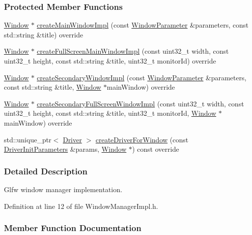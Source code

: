 \subsubsection*{Protected Member Functions}
\begin{DoxyCompactItemize}
\item 
\hyperlink{a00082}{Window} $\ast$ \hyperlink{a00090_ab33ae118afb5a7048c61d437e54b5c43}{create\+Main\+Window\+Impl} (const \hyperlink{a00091}{Window\+Parameter} \&parameters, const std\+::string \&title) override
\item 
\hyperlink{a00082}{Window} $\ast$ \hyperlink{a00090_acb8925ac309ba2705221a8db7357bb60}{create\+Full\+Screen\+Main\+Window\+Impl} (const uint32\+\_\+t width, const uint32\+\_\+t height, const std\+::string \&title, uint32\+\_\+t monitor\+Id) override
\item 
\hyperlink{a00082}{Window} $\ast$ \hyperlink{a00090_aed46f77f80b40c2a2e6ec23cb5dc5bf7}{create\+Secondary\+Window\+Impl} (const \hyperlink{a00091}{Window\+Parameter} \&parameters, const std\+::string \&title, \hyperlink{a00082}{Window} $\ast$main\+Window) override
\item 
\hyperlink{a00082}{Window} $\ast$ \hyperlink{a00090_a7fce1ce88b1aa3ec24b0b78fd5e56a64}{create\+Secondary\+Full\+Screen\+Window\+Impl} (const uint32\+\_\+t width, const uint32\+\_\+t height, const std\+::string \&title, uint32\+\_\+t monitor\+Id, \hyperlink{a00082}{Window} $\ast$main\+Window) override
\item 
std\+::unique\+\_\+ptr$<$ \hyperlink{a00024}{Driver} $>$ \hyperlink{a00090_a8d7410a6f39bc3f2e4255939e2549e9b}{create\+Driver\+For\+Window} (const \hyperlink{a00028}{Driver\+Init\+Parameters} \&params, \hyperlink{a00082}{Window} $\ast$) const  override
\end{DoxyCompactItemize}


\subsubsection{Detailed Description}
Glfw window manager implementation. 

Definition at line 12 of file Window\+Manager\+Impl.\+h.



\subsubsection{Member Function Documentation}

